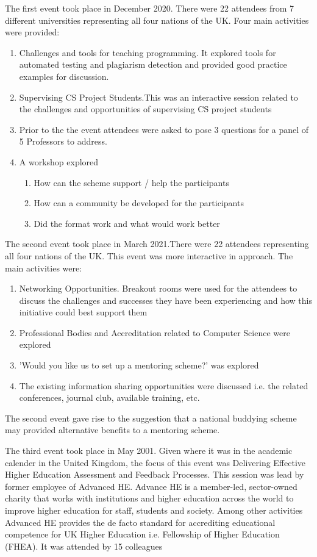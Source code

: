 \documentclass[sigconf]{acmart}
\begin{document}
The first event took place in December 2020. There were 22 attendees from 7 different universities representing all four nations of the UK. Four main activities were provided:
\begin{enumerate}
	\item Challenges and tools for teaching programming. It explored tools for automated testing and plagiarism detection and provided good practice examples for discussion.
	\item Supervising CS Project Students.This was an interactive session related to the challenges and opportunities of supervising CS project students
	\item Prior to the the event attendees were asked to pose 3 questions for a panel of 5 Professors to address. 
	\item A workshop explored
		\begin{enumerate}
			\item How can the scheme support / help the participants
			\item How can a community be developed for the participants
			\item Did the format work and what would work better
		\end{enumerate}
\end{enumerate}

The second event took place in March 2021.There were 22 attendees representing all four nations of the UK. This event was more interactive in approach. The main activities were:
\begin{enumerate}
	\item Networking Opportunities. Breakout rooms were used for the attendees to discuss the challenges and successes they have been experiencing and how this initiative could best support them
	\item Professional Bodies and Accreditation related to Computer Science were explored
	\item 'Would you like us to set up a mentoring scheme?' was explored
	\item The existing information sharing opportunities were discussed i.e. the related conferences, journal club, available training, etc. 
\end{enumerate}
The second event gave rise to the suggestion that a national buddying scheme may provided alternative benefits to a mentoring scheme.

The third event took place in May 2001. Given where it was in the academic calender in the United Kingdom, the focus of this event was Delivering Effective Higher Education Assessment and Feedback Processes. This session was lead by former employee of Advanced HE. Advance HE is a member-led, sector-owned charity that works with institutions and higher education across the world to improve higher education for staff, students and society. Among other activities Advanced HE provides the de facto standard for accrediting educational competence for UK Higher Education i.e. Fellowship of Higher Education (FHEA).  It was attended by 15 colleagues
\end{document}
